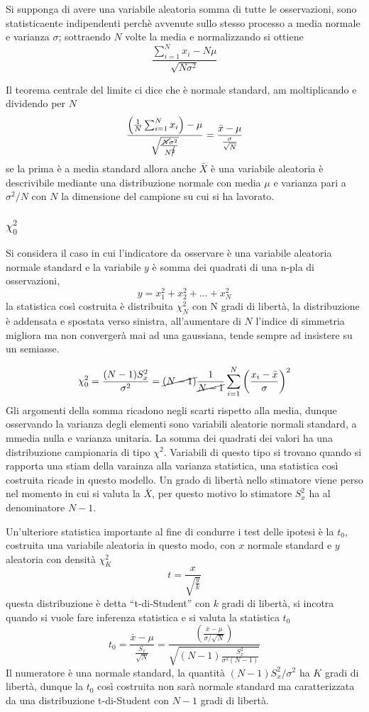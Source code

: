Si supponga di avere una variabile aleatoria somma di tutte le osservazioni, 
sono statisticaente indipendenti perchè avvenute sullo stesso processo a media 
normale e varianza $\sigma$; sottraendo $N$ volte la media e normalizzando si 
ottiene
$$
\frac{\sum_{i=1}^{N} x_i - N\mu}{\sqrt{N\sigma^2}}
$$

Il teorema centrale del limite ci dice che è normale standard, am moltiplicando e dividendo per $N$ 
$$
\frac{\left(\frac{1}{N}\sum_{i=1}^N x_i\right) - \mu}{\sqrt{\frac{\cancel{N}\sigma^2}{N^{\cancel{2}}}}} = \frac{\bar{x} - \mu}{\frac{\sigma}{\sqrt{N}}}
$$
se la prima è a media standard allora anche $\bar{X}$ è una variabile aleatoria è descrivibile mediante una distribuzione normale con media $\mu$ e varianza pari a $\sigma^2/N$ con $N$ la dimensione del campione su cui si ha lavorato.

\subsubsection{$\chi_0^2$}
Si considera il caso in cui l'indicatore da osservare è una variabile aleatoria normale standard e la variabile $y$ è somma dei quadrati di una n-pla di osservazioni, 
$$
y = x_1^2 + x_2^2+\ldots + x_N^2
$$la statistica così costruita è distribuita $\chi^2_N$ con N gradi di libertà, la distribuzione è addensata e spostata verso sinistra, all'aumentare di $N$ l'indice di simmetria migliora ma non convergerà mai ad una gaussiana, tende sempre ad insistere su un semiasse.

$$
\chi_0^2 = \frac{(N-1)S_x^2}{\sigma^2} = \cancel{(N-1)}\frac{1}{\cancel{N-1}}\sum_{i=1}^N \left(\frac{x_i-\bar{x}}{\sigma}\right)^2
$$
Gli argomenti della somma ricadono negli scarti rispetto alla media, dunque osservando la varianza degli elementi sono variabili aleatorie normali standard, a mmedia nulla e varianza unitaria. La somma dei quadrati dei valori ha una distribuzione campionaria di tipo $\chi^2$.
Variabili di questo tipo si trovano quando si rapporta una stiam della varainza alla varianza statistica, una statistica così costruita ricade in questo modello.
Un grado di libertà nello stimatore viene perso nel momento in cui si valuta la $\bar{X}$, per questo motivo lo stimatore $S_x^2$ ha al denominatore $N-1$.


Un'ulteriore statistica importante al fine di condurre i test delle ipotesi è la $t_0$, costruita una variabile aleatoria in questo modo, con $x$ normale standard e $y$ aleatoria con densità $\chi^2_K$
$$
t = \frac{x}{\sqrt{\frac{y}{k}}}
$$
questa distribuzione è detta ``t-di-Student'' con $k$ gradi di libertà, si incotra quando si vuole fare inferenza statistica e si valuta la statistica $t_0$
$$
t_0 = \frac{\bar{x}-\mu}{\frac{S_x}{\sqrt{N}}} = \frac{\left(\frac{\bar{x} -\mu }{\sigma/\sqrt{N}}\right)}{\sqrt{(N-1)\frac{S_x^2}{\sigma^2(N-1)}}}
$$
Il numeratore è una normale standard, la quantità $(N-1)S^2_x/\sigma^2 $ ha $K$ gradi di libertà, dunque la $t_0$ così costruita non sarà normale standard ma caratterizzata da una distribuzione t-di-Student con $N-1$ gradi di libertà.


